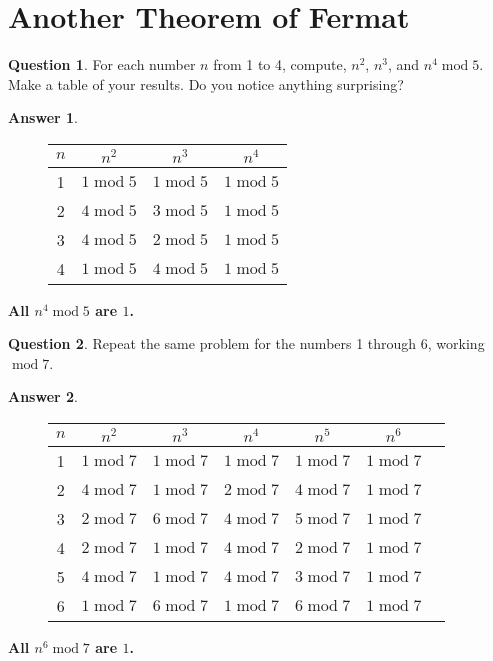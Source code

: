 \documentclass[article, 12pt]{article}
\theoremstyle{definition}
\newtheorem{question}{Question}
\newtheorem{answer}{Answer}
\newcommand{\Mod}[1]{\;\mathrm{mod}\; #1} %
\begin{document}
    \section{Another Theorem of Fermat}
    \begin{question}
        For each number $n$ from 1 to 4, compute, $n^2$, $n^3$, and $n^4 \Mod{5}$. Make a table of your results. Do you notice anything surprising?
    \end{question}
    \begin{answer} \
        \begin{figure}[H]
            \centering
            \begin{tabular}{|c|c|c|c|}
                \hline
                $n$ & $n^2$ & $n^3$ & $n^4$ \\
                \hline
                1 & $1 \Mod{5}$ & $1 \Mod{5}$ & $1 \Mod{5}$ \\
                2 & $4 \Mod{5}$ & $3 \Mod{5}$ & $1 \Mod{5}$ \\
                3 & $4 \Mod{5}$ & $2 \Mod{5}$ & $1 \Mod{5}$ \\
                4 & $1 \Mod{5}$ & $4 \Mod{5}$ & $1 \Mod{5}$ \\
                \hline
            \end{tabular}
        \end{figure}
        \textbf{All $n^4 \Mod{5}$ are $1$.} 
    \end{answer}
    \begin{question}
        Repeat the same problem for the numbers 1 through 6, working $\Mod{7}$.
    \end{question}
    \begin{answer} \
        \begin{figure}[H]
            \centering
            
            \begin{tabular}{|c|c|c|c|c|c|c|}
                \hline
                $n$ & $n^2$ & $n^3$ & $n^4$ & $n^5$ & $n^6$ \\
                \hline
                1 & $1 \Mod{7}$ & $1 \Mod{7}$ & $1 \Mod{7}$ & $1 \Mod{7}$ & $1 \Mod{7}$ \\
                2 & $4 \Mod{7}$ & $1 \Mod{7}$ & $2 \Mod{7}$ & $4 \Mod{7}$ & $1 \Mod{7}$ \\
                3 & $2 \Mod{7}$ & $6 \Mod{7}$ & $4 \Mod{7}$ & $5 \Mod{7}$ & $1 \Mod{7}$ \\
                4 & $2 \Mod{7}$ & $1 \Mod{7}$ & $4 \Mod{7}$ & $2 \Mod{7}$ & $1 \Mod{7}$ \\
                5 & $4 \Mod{7}$ & $1 \Mod{7}$ & $4 \Mod{7}$ & $3 \Mod{7}$ & $1 \Mod{7}$ \\
                6 & $1 \Mod{7}$ & $6 \Mod{7}$ & $1 \Mod{7}$ & $6 \Mod{7}$ & $1 \Mod{7}$ \\
                \hline
            \end{tabular}
        \end{figure}
        \textbf{All $n^6 \Mod{7}$ are $1$.}
    \end{answer}
\end{document}
